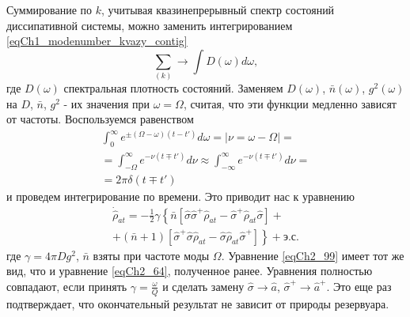 Суммирование по $k$,  учитывая квазинепрерывный спектр состояний
диссипативной системы, можно заменить интегрированием
\eqref{eqCh1_modenumber_kvazy_contig} 
\[
\sum_{(k)} \rightarrow \int D\left(\omega\right)d \omega,
\]  
где $D\left(\omega\right)$ спектральная плотность состояний. Заменяем
$D\left(\omega\right)$, $\bar{n}\left(\omega\right)$,
$g^2\left(\omega\right)$ на $D$, $\bar{n}$, $g^2$ - их значения при
$\omega = \Omega$,  считая, что эти функции медленно   
зависят от частоты. Воспользуемся равенством
\begin{eqnarray}
\int_{0}^\infty
e^{\pm\left(\Omega - \omega\right)
\left(t - t'\right)}d \omega = \left|\nu = \omega - \Omega\right| =
\nonumber \\
=
\int_{-\Omega}^\infty
e^{ - \nu
\left(t \mp t'\right)}d \nu \approx
\int_{-\infty}^\infty
e^{ - \nu
\left(t \mp t'\right)}d \nu = 
\nonumber \\
= 2 \pi \delta \left(t \mp t'\right) 
\label{eqCh2_98}
\end{eqnarray}
и проведем интегрирование по времени. Это приводит нас к уравнению 
\begin{eqnarray}
\dot{\hat{\rho}}_{at} = -\frac{1}{2}\gamma \left\{
\bar{n}\left[
\hat{\sigma}\hat{\sigma}^{+}\hat{\rho}_{at} -
\hat{\sigma}^{+}\hat{\rho}_{at}\hat{\sigma}
\right] +
\right.
\nonumber \\
+
\left.
\left(\bar{n} + 1\right)\left[
\hat{\sigma}^{+}\hat{\sigma}\hat{\rho}_{at} -
\hat{\sigma}\hat{\rho}_{at}\hat{\sigma}^{+}
\right]
\right\}
+ \mbox{э.с.}
\label{eqCh2_99}
\end{eqnarray}
где $\gamma =4 \pi D g^2$, $\bar{n}$ взяты при частоте моды $\Omega$.
Уравнение \eqref{eqCh2_99} имеет тот же вид, что и уравнение
\eqref{eqCh2_64}, полученное ранее. Уравнения 
полностью совпадают, если  принять $\gamma = \frac{\omega}{Q}$ и
сделать замену $\hat{\sigma} \rightarrow \hat{a}$, $\hat{\sigma}^{+}
\rightarrow \hat{a}^{+}$.  Это еще раз подтверждает, что окончательный
результат не зависит от природы резервуара.   


